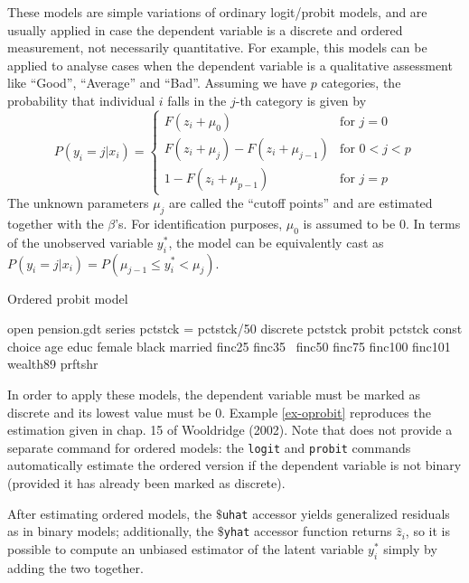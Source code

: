 These models are simple variations of ordinary logit/probit models,
and are usually applied in case the dependent variable is a
discrete and ordered measurement, not necessarily quantitative. For
example, this models can be applied to analyse cases when the
dependent variable is a qualitative assessment like ``Good'',
``Average'' and ``Bad''. Assuming we have $p$ categories, the
probability that individual $i$ falls in the $j$-th category is given
by
\begin{equation}
  \label{eq:QR-ordered}
  P(y_i = j | x_i) = \left\{
    \begin{array}{ll}
      F(z_i + \mu_0) & \textrm{for } j = 0 \\
      F(z_i + \mu_j) -  F(z_i + \mu_{j-1}) & \textrm{for } 0 < j < p \\
      1 -  F(z_i + \mu_{p-1}) & \textrm{for } j = p 
    \end{array}
    \right.
\end{equation}
The unknown parameters $\mu_j$ are called the ``cutoff
points'' and are estimated together with the $\beta$'s. For
identification purposes, $\mu_0$ is assumed to be 0. In terms of the
unobserved variable $y^*_i$, the model can be equivalently cast as
$P(y_i = j | x_i) = P(\mu_{j-1} \le y^*_i < \mu_j)$. 

\begin{script}[htbp]
  \caption{Ordered probit model}
  \label{ex-oprobit}
\begin{code}
open pension.gdt
series pctstck = pctstck/50
discrete pctstck
probit pctstck const choice age educ female black married finc25 finc35 \
  finc50 finc75 finc100 finc101 wealth89 prftshr
\end{code}
\end{script}

In order to apply these models, the dependent variable must be marked
as discrete and its lowest value must be 0. Example \ref{ex-oprobit}
reproduces the estimation given in chap. 15 of Wooldridge (2002). Note
that \app{gretl} does not provide a separate command for ordered
models: the \texttt{logit} and \texttt{probit} commands automatically
estimate the ordered version if the dependent variable is not binary
(provided it has already been marked as discrete).

After estimating ordered models, the \texttt{$\$$uhat} accessor yields
generalized residuals as in binary models; additionally, the
\texttt{$\$$yhat} accessor function returns $\hat{z}_i$, so it is
possible to compute an unbiased estimator of the latent variable
$y^*_i$ simply by adding the two together.

